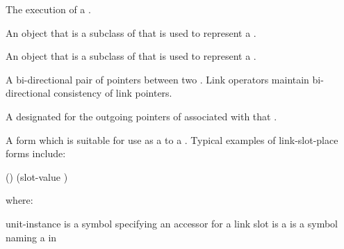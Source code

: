 \begin{glossary-list}

\glent[KS~execution]
%
%
%
%
%
The execution of a .


\glent[ks~class]
%
%
%
%
%
An object that is a subclass of
\textbf{} that is used to represent a
.


%
%
%
%
%
An object that is a subclass of \textbf{}
that is used to represent a .


\glent[link]
%
%
%
A bi-directional pair of pointers between two .
Link operators maintain bi-directional consistency of link pointers.


%
%
%
A  designated for the outgoing pointers of 
associated with that .


%
%
%
%
A form which is suitable for use as a  to
a .  Typical examples of link-slot-place forms
include:
\T\vspace{2pt}
\begin{example}
  ()
  (slot-value )
\end{example}
where:
\begin{args}{unit-instance}
 is a symbol specifying an accessor  for a
link slot 
 is a 
 is a symbol naming a  in
\end{args}


\end{glossary-list}
